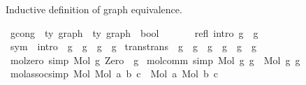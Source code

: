\begin{isabellebody}
\begin{isamarkuptext}
Inductive definition of graph equivalence.%
\end{isamarkuptext}\isamarkuptrue%
\isamarkupfalse%
\ gcong\ {\isacharcolon}{\kern0pt}{\isacharcolon}{\kern0pt}\ {\isachardoublequoteopen}{\isacharprime}{\kern0pt}ty\ graph\ {\isacharequal}{\kern0pt}{\isachargreater}{\kern0pt}\ {\isacharprime}{\kern0pt}ty\ graph\ {\isacharequal}{\kern0pt}{\isachargreater}{\kern0pt}\ bool{\isachardoublequoteclose}\ {\isacharparenleft}{\kern0pt}\ {\isachardoublequoteopen}{\isasymsimeq}{\isachardoublequoteclose}\ {}{}{\isacharparenright}{\kern0pt}\isanewline
{}\isanewline
\ \isanewline
\ \ refl\ {\isacharbrackleft}{\kern0pt}intro{\isacharbang}{\kern0pt}{\isacharbrackright}{\kern0pt}{\isacharcolon}{\kern0pt}\ {\isachardoublequoteopen}g\ {\isasymsimeq}\ g{\isachardoublequoteclose}\isanewline
{\isacharbar}{\kern0pt}\ sym\ \ {\isacharbrackleft}{\kern0pt}intro{\isacharbrackright}{\kern0pt}{\isacharcolon}{\kern0pt}\ \ {\isachardoublequoteopen}g{}\ {\isasymsimeq}\ g{}\ {\isacharequal}{\kern0pt}{\isacharequal}{\kern0pt}{\isachargreater}{\kern0pt}\ g{}\ {\isasymsimeq}\ g{}{\isachardoublequoteclose}\isanewline
{\isacharbar}{\kern0pt}\ trans{\isacharbrackleft}{\kern0pt}trans{\isacharbrackright}{\kern0pt}{\isacharcolon}{\kern0pt}\ \ {\isachardoublequoteopen}g{}\ {\isasymsimeq}\ g{}\ {\isacharequal}{\kern0pt}{\isacharequal}{\kern0pt}{\isachargreater}{\kern0pt}\ g{}\ {\isasymsimeq}\ g{}\ {\isacharequal}{\kern0pt}{\isacharequal}{\kern0pt}{\isachargreater}{\kern0pt}\ g{}\ {\isasymsimeq}\ g{}{\isachardoublequoteclose}\isanewline
\isanewline
\ \isanewline
{\isacharbar}{\kern0pt}\ mol{\isacharunderscore}{\kern0pt}zero\ {\isacharbrackleft}{\kern0pt}simp{\isacharbrackright}{\kern0pt}{\isacharcolon}{\kern0pt}\ {\isachardoublequoteopen}Mol\ g\ Zero\ {\isasymsimeq}\ g{\isachardoublequoteclose}\isanewline
{\isacharbar}{\kern0pt}\ mol{\isacharunderscore}{\kern0pt}comm\ {\isacharbrackleft}{\kern0pt}simp{\isacharbrackright}{\kern0pt}{\isacharcolon}{\kern0pt}\ {\isachardoublequoteopen}Mol\ g{}\ g{}\ {\isasymsimeq}\ Mol\ g{}\ g{}{\isachardoublequoteclose}\isanewline
{\isacharbar}{\kern0pt}\ mol{\isacharunderscore}{\kern0pt}assoc{\isacharbrackleft}{\kern0pt}simp{\isacharbrackright}{\kern0pt}{\isacharcolon}{\kern0pt}\ {\isachardoublequoteopen}Mol\ {\isacharparenleft}{\kern0pt}Mol\ a\ b{\isacharparenright}{\kern0pt}\ c\ {\isasymsimeq}\ Mol\ a\ {\isacharparenleft}{\kern0pt}Mol\ b\ c{\isacharparenright}{\kern0pt}{\isachardoublequoteclose}\isanewline

\end{isabellebody}
